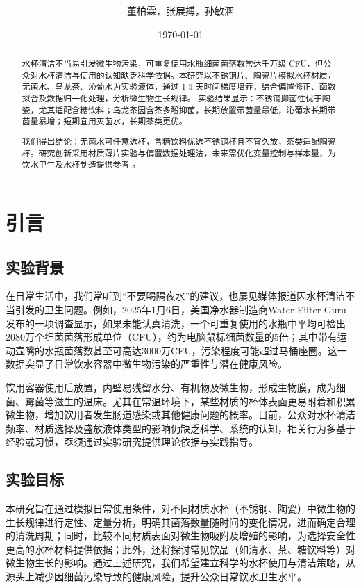 \documentclass[12pt,a4paper]{ctexart}
\title{ }
\author{董柏霖，张展搏，孙敏涵}
\date{\today}  %
\begin{document}
\maketitle  %

\begin{abstract}
水杯清洁不当易引发微生物污染，可重复使用水瓶细菌菌落数常达千万级 CFU，但公众对水杯清洁与使用的认知缺乏科学依据。本研究以不锈钢片、陶瓷片模拟水杯材质，无菌水、乌龙茶、沁葡水为实验液体，通过 1-5 天时间梯度培养，结合偏置修正、函数拟合及数据归一化处理，分析微生物生长规律。
实验结果显示：不锈钢抑菌性优于陶瓷，尤其适配含糖饮料；乌龙茶因含茶多酚抑菌，长期放置带菌量最低，沁葡水长期带菌量暴增；短期宜用灭菌水，长期茶类更优。

我们得出结论：无菌水可任意选杯，含糖饮料优选不锈钢杯且不宜久放，茶类适配陶瓷杯。研究创新采用材质薄片实验与偏置数据处理法，未来需优化变量控制与样本量，为饮水卫生及水杯制造提供参考 。
\end{abstract}
\newpage
\tableofcontents
\newpage

\section{引言}
\subsection{实验背景}

在日常生活中，我们常听到“不要喝隔夜水”的建议，也屡见媒体报道因水杯清洁不当引发的卫生问题。例如，2025年1月6日，美国净水器制造商Water Filter Guru发布的一项调查显示，如果未能认真清洗，一个可重复使用的水瓶中平均可检出2080万个细菌菌落形成单位（CFU），约为电脑鼠标细菌数量的5倍；其中带有运动壶嘴的水瓶菌落数甚至可高达3000万CFU，污染程度可能超过马桶座圈。这一数据突显了日常饮水容器中微生物污染的严重性与潜在健康风险。

饮用容器使用后放置，内壁易残留水分、有机物及微生物，形成生物膜，成为细菌、霉菌等滋生的温床。尤其在常温环境下，某些材质的杯体表面更易附着和积累微生物，增加饮用者发生肠道感染或其他健康问题的概率。目前，公众对水杯清洁频率、材质选择及盛放液体类型的影响仍缺乏科学、系统的认知，相关行为多基于经验或习惯，亟须通过实验研究提供理论依据与实践指导。

\subsection{实验目标}

本研究旨在通过模拟日常使用条件，对不同材质水杯（不锈钢、陶瓷）中微生物的生长规律进行定性、定量分析，明确其菌落数量随时间的变化情况，进而确定合理的清洗周期；同时，比较不同材质表面对微生物吸附及增殖的影响，为选择安全性更高的水杯材料提供依据；此外，还将探讨常见饮品（如清水、茶、糖饮料等）对微生物生长的影响。通过上述研究，我们希望建立科学的水杯使用与清洁策略，从源头上减少因细菌污染导致的健康风险，提升公众日常饮水卫生水平。
\end{document}
